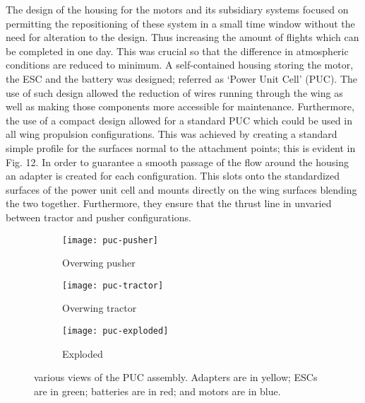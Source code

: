 \documentclass[../../main.tex]{subfiles}
\begin{document}
The design of the housing for the motors and its subsidiary systems focused on permitting the repositioning of these system in a small time window without the need for alteration to the design.
Thus increasing the amount of flights which can be completed in one day.
This was crucial so that the difference in atmospheric conditions are reduced to minimum. 
A self-contained housing storing the motor, the ESC and the battery was designed; referred as ‘Power Unit Cell’ (PUC).
The use of such design allowed the reduction of wires running through the wing as well as making those components more accessible for maintenance.
Furthermore, the use of a compact design allowed for a standard PUC which could be used in all wing propulsion configurations.
This was achieved by creating a standard simple profile for the surfaces normal to the attachment points; this is evident in Fig. 12.
In order to guarantee a smooth passage of the flow around the housing an adapter is created for each configuration.
This slots onto the standardized surfaces of the power unit cell and mounts directly on the wing surfaces blending the two together.
Furthermore, they ensure that the thrust line in unvaried between tractor and pusher configurations. 


\begin{figure}[H]
    \centering
    \begin{subfigure}[b]{0.49\columnwidth}
        \centering
        \texttt{[image: puc-pusher]}
        \caption{Overwing pusher}
        \label{fig:puc-assemblies:pusher}
    \end{subfigure}
    \hfill
    \begin{subfigure}[b]{0.49\columnwidth}
        \centering
        \texttt{[image: puc-tractor]}
        \caption{Overwing tractor}
        \label{fig:puc-assemblies:tractor}
    \end{subfigure}

    \begin{subfigure}[b]{0.7\columnwidth}
        \centering
        \texttt{[image: puc-exploded]}
        \caption{Exploded}
        \label{fig:puc-assemblies:exploded}
    \end{subfigure}
    
    \caption{
        various views of the PUC assembly.
        Adapters are in yellow; ESCs are in green; batteries are in red; and motors are in blue.
    }
    \label{fig:puc-assemblies}
\end{figure} 
\end{document}

